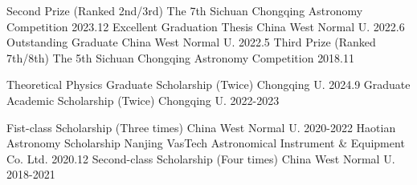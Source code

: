 

\begin{cvhonors}

  \cvhonor
    {Second Prize (Ranked 2nd/3rd)} %
    {The 7th Sichuan Chongqing Astronomy Competition} %
    {} %
    {2023.12} %
  \cvhonor
    {Excellent Graduation Thesis} %
    {China West Normal U.} %
    {} %
    {2022.6} %
  \cvhonor
    {Outstanding Graduate} %
    {China West Normal U.} %
    {} %
    {2022.5} %
  \cvhonor
    {Third Prize (Ranked 7th/8th)} %
    {The 5th Sichuan Chongqing Astronomy Competition} %
    {} %
    {2018.11} %

\end{cvhonors}


\begin{cvhonors}

  \cvhonor
    {Theoretical Physics Graduate Scholarship (Twice)} %
    {Chongqing U.} %
    {} %
    {2024.9} %
  \cvhonor
    {Graduate Academic Scholarship (Twice)} %
    {Chongqing U.} %
    {} %
    {2022-2023} %

  \cvhonor
    {Fist-class Scholarship (Three times)} %
    {China West Normal U.} %
    {} %
    {2020-2022} %
  \cvhonor
    {Haotian Astronomy Scholarship} %
    {Nanjing VasTech Astronomical Instrument \& Equipment Co. Ltd.} %
    {} %
    {2020.12} %
  \cvhonor
    {Second-class Scholarship (Four times)} %
    {China West Normal U.} %
    {} %
    {2018-2021} %
\end{cvhonors}
